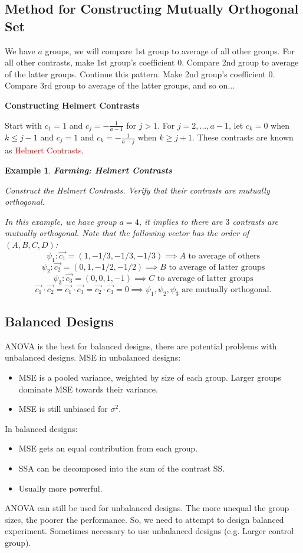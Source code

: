 \documentclass[a4paper,11pt]{article}
\newtheorem{eg}[thm]{Example}
\begin{document}
\subsection{Method for Constructing Mutually Orthogonal Set}
We have $a$ groups, we will compare 1st group to average of all other groups. For all other contrasts, make 1st group's coefficient 0. Compare 2nd group to average of the latter groups. Continue this pattern. Make 2nd group's coefficient 0. Compare 3rd group to average of the latter groups, and so on...

\textbf{Constructing Helmert Contrasts}

Start with $c_1=1$ and $c_j=-\frac{1}{a-1}$ for $j>1$. For $j=2,...,a-1$, let $c_k=0$ when $k\leq j-1$ and $c_j=1$ and $c_k=-\frac{1}{a-j}$ when $k\geq j+1$. These contrasts are known as \textcolor{red}{Helmert Contrasts}. 

\begin{eg}
\normalfont
\textbf{Farming: Helmert Contrasts}

Construct the Helmert Contrasts. Verify that their contrasts are mutually orthogonal. 

In this example, we have group $a=4$, it implies to there are $3$ contrasts are mutually orthogonal. Note that the following vector has the order of $(A, B, C, D)$:
$$\psi_1: \vec{c_1}=(1,-1/3, -1/3, -1/3)\implies A \text{ to average of others}$$
$$\psi_2: \vec{c_2}=(0, 1, -1/2, -1/2)\implies B \text{ to average of latter groups}$$
$$\psi_3: \vec{c_3}=(0, 0, 1, -1)\implies C \text{ to average of latter groups}$$
$$\vec{c_1}\cdot \vec{c_2}=\vec{c_1}\cdot \vec{c_3}=\vec{c_2}\cdot \vec{c_3}=0\implies \psi_1, \psi_2, \psi_3 \text{ are mutually orthogonal.} $$
\end{eg}

\subsection{Balanced Designs}
ANOVA is the best for balanced designs, there are potential problems with unbalanced designs. MSE in unbalanced designs:
\begin{itemize}
\item MSE is a pooled variance, weighted by size of each group. Larger groups dominate MSE towards their variance. 
\item MSE is still unbiased for $\sigma^2$. 
\end{itemize}
In balanced designs: 
\begin{itemize}
\item MSE gets an equal contribution from each group. 
\item SSA can be decomposed into the sum of the contrast SS. 
\item Usually more powerful. 
\end{itemize}
ANOVA can still be used for unbalanced designs. The more unequal the group sizes, the poorer the performance. So, we need to attempt to design balanced experiment. Sometimes necessary to use unbalanced designs (e.g. Larger control group). 
\end{document}
